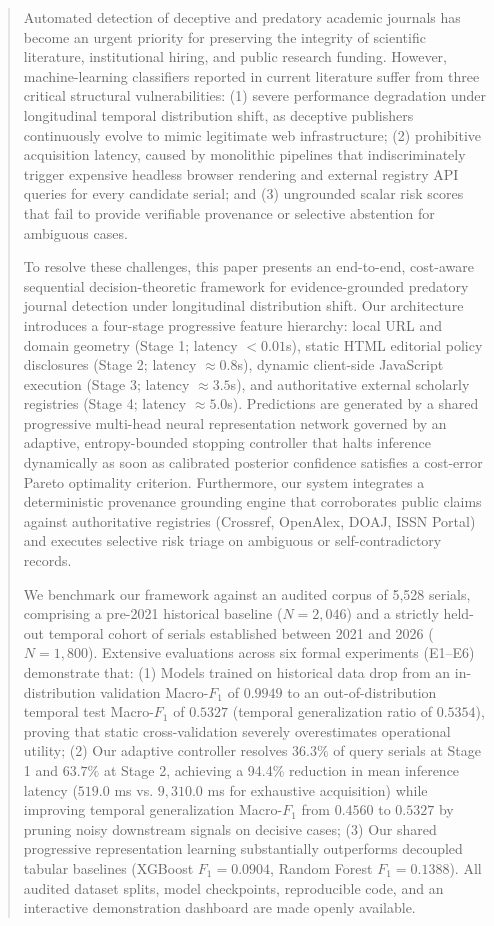 \documentclass[journal]{IEEEtran}
\begin{document}
\begin{abstract}
Automated detection of deceptive and predatory academic journals has become an urgent priority for preserving the integrity of scientific literature, institutional hiring, and public research funding. However, machine-learning classifiers reported in current literature suffer from three critical structural vulnerabilities: (1) severe performance degradation under longitudinal temporal distribution shift, as deceptive publishers continuously evolve to mimic legitimate web infrastructure; (2) prohibitive acquisition latency, caused by monolithic pipelines that indiscriminately trigger expensive headless browser rendering and external registry API queries for every candidate serial; and (3) ungrounded scalar risk scores that fail to provide verifiable provenance or selective abstention for ambiguous cases.

To resolve these challenges, this paper presents an end-to-end, cost-aware sequential decision-theoretic framework for evidence-grounded predatory journal detection under longitudinal distribution shift. Our architecture introduces a four-stage progressive feature hierarchy: local URL and domain geometry (Stage 1; latency $<0.01$s), static HTML editorial policy disclosures (Stage 2; latency $\approx 0.8$s), dynamic client-side JavaScript execution (Stage 3; latency $\approx 3.5$s), and authoritative external scholarly registries (Stage 4; latency $\approx 5.0$s). Predictions are generated by a shared progressive multi-head neural representation network governed by an adaptive, entropy-bounded stopping controller that halts inference dynamically as soon as calibrated posterior confidence satisfies a cost-error Pareto optimality criterion. Furthermore, our system integrates a deterministic provenance grounding engine that corroborates public claims against authoritative registries (Crossref, OpenAlex, DOAJ, ISSN Portal) and executes selective risk triage on ambiguous or self-contradictory records.

We benchmark our framework against an audited corpus of 5,528 serials, comprising a pre-2021 historical baseline ($N=2,046$) and a strictly held-out temporal cohort of serials established between 2021 and 2026 ($N=1,800$). Extensive evaluations across six formal experiments (E1--E6) demonstrate that:
(1) Models trained on historical data drop from an in-distribution validation Macro-$F_1$ of $0.9949$ to an out-of-distribution temporal test Macro-$F_1$ of $0.5327$ (temporal generalization ratio of $0.5354$), proving that static cross-validation severely overestimates operational utility;
(2) Our adaptive controller resolves $36.3\%$ of query serials at Stage 1 and $63.7\%$ at Stage 2, achieving a 94.4\% reduction in mean inference latency ($519.0$ ms vs. $9,310.0$ ms for exhaustive acquisition) while improving temporal generalization Macro-$F_1$ from $0.4560$ to $0.5327$ by pruning noisy downstream signals on decisive cases;
(3) Our shared progressive representation learning substantially outperforms decoupled tabular baselines (XGBoost $F_1 = 0.0904$, Random Forest $F_1 = 0.1388$).
All audited dataset splits, model checkpoints, reproducible code, and an interactive demonstration dashboard are made openly available.
\end{abstract}
\end{document}
